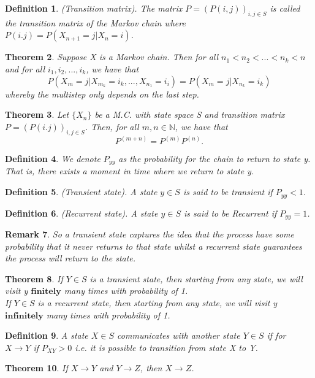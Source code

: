 \documentclass[twoside]{article}
\newcounter{lecnum}
\newtheorem{theorem}{Theorem}[lecnum]
\newtheorem{remark}[theorem]{Remark}
\newtheorem{definition}[theorem]{Definition}
\begin{document}
\begin{definition}(Transition matrix). The matrix $P = (P(i,j))_{i, j \in S}$ is called the transition matrix of the Markov chain where $P(i.j) = P(X_{n+1}=j|X_n=i)$. 
\end{definition}


\begin{theorem}Suppose X is a Markov chain. Then for all $n_1 < n_2 < ... < n_k < n$ and for all $i_1,i_2,...,i_k$, we have that 
$$
P(X_m=j|X_{m_{k}}=i_k,...,X_{n_{1}}=i_i) = P(X_m=j|X_{n_{k}}=i_k)
$$
whereby the multistep only depends on the last step. 
\end{theorem}

\begin{theorem}Let $\{X_n\}$ be a M.C. with state space S and transition matrix $P = (P(i.j))_{i,j \in S}$. Then, for all $m,n \in \mathbb{N}$, we have that 
$$
P^{(m+n)} = P^{(m)}P^{(n)}.
$$
\end{theorem}

\begin{definition}We denote $P_{yy}$ as the probability for the chain to return to state y. That is, there exists a moment in time where we return to state y.
\end{definition}

\begin{definition}(Transient state). A state $y \in S$ is said to be transient if $P_{yy} < 1$.
\end{definition}

\begin{definition}(Recurrent state). A state $y \in S$ is said to be Recurrent if $P_{yy} = 1$.
\end{definition}

\begin{remark}So a transient state captures the idea that the process have some probability that it never returns to that state whilst a recurrent state guarantees the process will return to the state.
\end{remark}

\begin{theorem}If $Y \in S$ is a transient state, then starting from any state, we will visit y $\textbf{finitely}$ many times with probability of 1.\\ If $Y \in S$ is a recurrent state, then starting from any state, we will visit y $\textbf{infinitely}$ many times with probability of 1.
\end{theorem}


\begin{definition}A state $X \in S$ communicates with another state $Y \in S$ if for $X \rightarrow Y$ if $P_{XY} > 0$ i.e. it is possible to transition from state X to Y.
\end{definition}
\begin{theorem}If $X \rightarrow Y$ and $Y \rightarrow Z$, then $X \rightarrow Z$.
\end{theorem}
\end{document}
